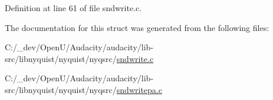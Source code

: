 Definition at line 61 of file sndwrite.\+c.



The documentation for this struct was generated from the following files\+:\begin{DoxyCompactItemize}
\item 
C\+:/\+\_\+dev/\+Open\+U/\+Audacity/audacity/lib-\/src/libnyquist/nyquist/nyqsrc/\hyperlink{sndwrite_8c}{sndwrite.\+c}\item 
C\+:/\+\_\+dev/\+Open\+U/\+Audacity/audacity/lib-\/src/libnyquist/nyquist/nyqsrc/\hyperlink{sndwritepa_8c}{sndwritepa.\+c}\end{DoxyCompactItemize}
